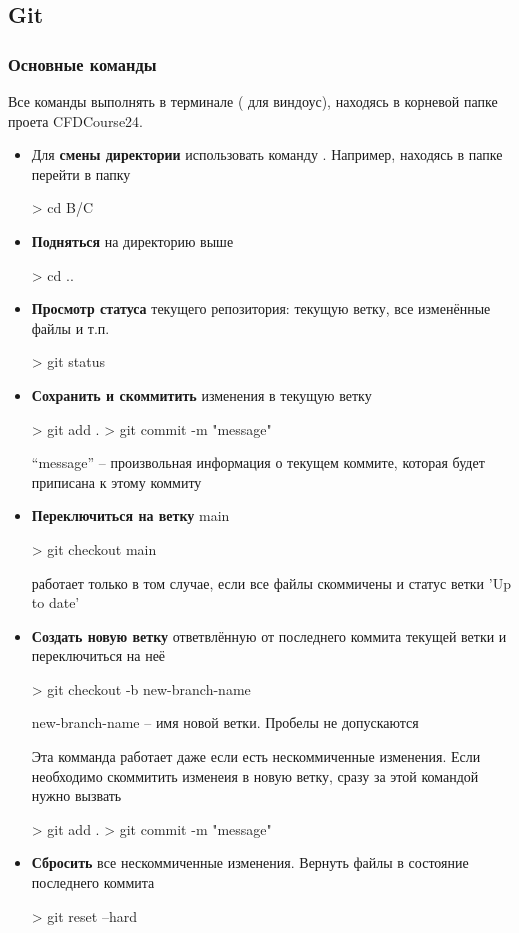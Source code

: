 \subsection{Git}
\subsubsection{Основные команды}
Все команды выполнять в терминале ( для виндоус),
находясь в корневой папке проета CFDCourse24.
\begin{itemize}
\item
  Для {\bf смены директории} использовать команду . Например, находясь в папке  перейти в папку 
  \begin{shelloutput}
> cd B/C
  \end{shelloutput}
\item
  {\bf Подняться} на директорию выше
  \begin{shelloutput}
> cd ..
  \end{shelloutput}
\item
  {\bf Просмотр статуса} текущего репозитория: текущую ветку, все изменённые файлы и т.п.
  \begin{shelloutput}
> git status
  \end{shelloutput}
\item
  {\bf Сохранить и скоммитить} изменения в текущую ветку
  \begin{shelloutput}
> git add .
> git commit -m "message"
  \end{shelloutput}

  ``message'' -- произвольная информация о текущем коммите, которая будет приписана к этому коммиту
\item
  {\bf Переключиться на ветку} main
  \begin{shelloutput}
> git checkout main
  \end{shelloutput}

  работает только в том случае, если все файлы скоммичены и статус ветки 'Up to date'
\item
  {\bf Создать новую ветку} ответвлённую от последнего коммита текущей ветки и переключиться на неё
  \begin{shelloutput}
> git checkout -b new-branch-name
  \end{shelloutput}

  new-branch-name -- имя новой ветки. Пробелы не допускаются

  Эта комманда работает даже если есть нескоммиченные изменения. 
  Если необходимо скоммитить изменеия в новую ветку, сразу за этой командой нужно вызвать
  \begin{shelloutput}
> git add .
> git commit -m "message"
  \end{shelloutput}
\item
  {\bf Сбросить} все нескоммиченные изменения. Вернуть файлы в состояние последнего коммита
  \begin{shelloutput}
> git reset --hard
  \end{shelloutput}


\end{itemize}

